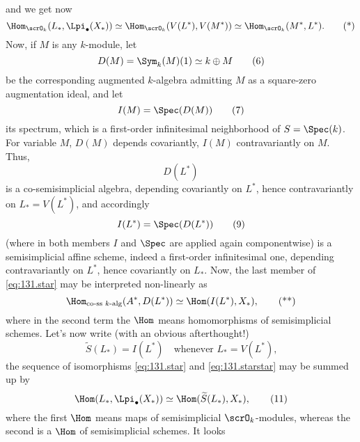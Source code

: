and we get now
\begin{equation}
  \label{eq:131.star}
  \Hom_{\scrO_k}(L_*,\Lpi_\bullet(X_*)) \simeq
  \Hom_{\scrO_k}(V(L^*),V(M^*)) \simeq
  \Hom_{\scrO_k}(M^*,L^*).\tag{*}
\end{equation}
Now, if $M$ is any $k$-module, let
\begin{equation}
  \label{eq:131.6}
  D(M) = \Sym_k(M)(1) \simeq k\oplus M\tag{6}
\end{equation}
be the corresponding augmented $k$-algebra admitting $M$
as a square-zero augmentation ideal, and let
\begin{equation}
  \label{eq:131.7}
  I(M) = \Spec(D(M))\tag{7}
\end{equation}
its spectrum, which is a first-order infinitesimal neighborhood of
$S=\Spec(k)$. For variable $M$, $D(M)$ depends covariantly, $I(M)$
contravariantly on $M$. Thus,
\begin{equation}
  \label{eq:131.8}
  D(L^*)\tag{8}
\end{equation}
is a co-semisimplicial algebra, depending covariantly on $L^*$, hence
contravariantly on $L_*=V(L^*)$, and accordingly
\begin{equation}
  \label{eq:131.9}
  I(L^*) = \Spec(D(L^*))\tag{9}
\end{equation}
(where in both members $I$ and $\Spec$ are applied again
componentwise) is a semisimplicial affine scheme, indeed a first-order
infinitesimal one, depending contravariantly on $L^*$, hence
covariantly on $L_*$. Now, the last member of \eqref{eq:131.star} may
be interpreted non-linearly as
\begin{equation}
  \label{eq:131.starstar}
  \Hom_{\textup{co-ss $k$-alg}}(A^*,D(L^*))
  \simeq
  \Hom(I(L^*), X_*),\tag{**}
\end{equation}
where in the second term the $\Hom$ means homomorphisms of
semisimplicial schemes. Let's now write (with an obvious
afterthought!)
\begin{equation}
  \label{eq:131.10}
  \widetilde S(L_*) = I(L^*)\quad
  \text{whenever $L_*=V(L^*)$,}\tag{10}
\end{equation}
the sequence of isomorphisms \eqref{eq:131.star} and
\eqref{eq:131.starstar} may be summed up by
\begin{equation}
  \label{eq:131.11}
  \Hom(L_*,\Lpi_\bullet(X_*)) \simeq
  \Hom(\widetilde S(L_*),X_*),\tag{11} 
\end{equation}
where the first $\Hom$ means maps of semisimplicial $\scrO_k$-modules,
whereas the second is a $\Hom$ of semisimplicial schemes. It looks
